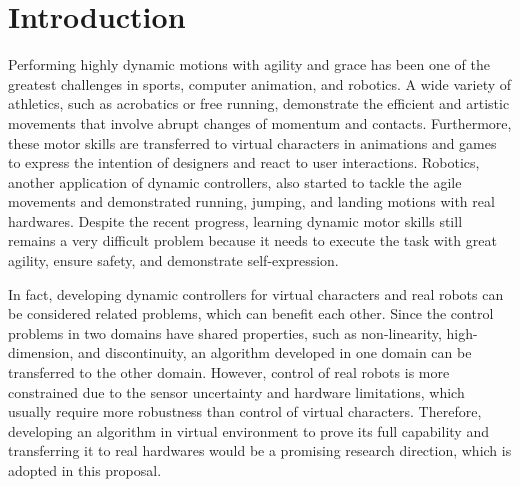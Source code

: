 \chapter{Introduction}


Performing highly dynamic motions with agility and grace has been
one of the greatest challenges in sports, computer animation, and robotics.
A wide variety of athletics, such as acrobatics or free running, demonstrate the
efficient and artistic movements that involve abrupt changes of momentum
and contacts.
Furthermore, these motor skills are transferred to virtual characters 
in animations and games to express the intention of designers
and react to user interactions.
Robotics, another application of dynamic controllers, also started 
to tackle the agile movements and demonstrated
running, jumping, and landing motions with real hardwares.
Despite the recent progress, 
learning dynamic motor skills still remains a very difficult
problem because it needs to execute the task with great agility, 
ensure safety, and demonstrate self-expression.

In fact, developing dynamic controllers for virtual characters and
real robots can be considered related problems,
which can benefit each other.
Since the control problems in two domains have shared properties,
such as non-linearity, high-dimension, and discontinuity,
an algorithm developed in one domain can be transferred 
to the other domain.
However, control of real robots is more constrained
due to the sensor uncertainty and hardware limitations, which 
usually require more robustness than control of virtual characters.
Therefore, developing an algorithm in virtual environment to prove its
full capability and transferring it to real hardwares would be
a promising research direction, which is adopted in this proposal.

